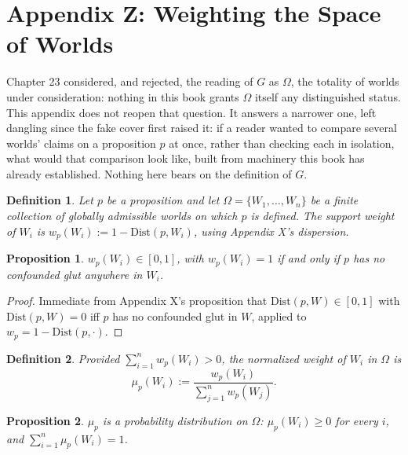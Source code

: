 \documentclass[11pt]{book}
\newtheorem*{appendixdefinition}{Definition}
\newtheorem*{appendixproposition}{Proposition}
\begin{document}
\chapter*{Appendix Z: Weighting the Space of Worlds}

Chapter 23 considered, and rejected, the reading of $G$ as $\Omega$, the totality of worlds under consideration: nothing in this book grants $\Omega$ itself any distinguished status. This appendix does not reopen that question. It answers a narrower one, left dangling since the fake cover first raised it: if a reader wanted to compare several worlds' claims on a proposition $p$ at once, rather than checking each in isolation, what would that comparison look like, built from machinery this book has already established. Nothing here bears on the definition of $G$.

\begin{appendixdefinition}
Let $p$ be a proposition and let $\Omega = \{W_1, \dots, W_n\}$ be a finite collection of globally admissible worlds on which $p$ is defined. The \emph{support weight} of $W_i$ is $w_p(W_i) := 1 - \mathrm{Dist}(p, W_i)$, using Appendix X's dispersion.
\end{appendixdefinition}

\begin{appendixproposition}
$w_p(W_i) \in [0,1]$, with $w_p(W_i) = 1$ if and only if $p$ has no confounded glut anywhere in $W_i$.
\end{appendixproposition}

\begin{proof}
Immediate from Appendix X's proposition that $\mathrm{Dist}(p,W) \in [0,1]$ with $\mathrm{Dist}(p,W) = 0$ iff $p$ has no confounded glut in $W$, applied to $w_p = 1 - \mathrm{Dist}(p,\cdot)$.
\end{proof}

\begin{appendixdefinition}
Provided $\sum_{i=1}^n w_p(W_i) > 0$, the \emph{normalized weight} of $W_i$ in $\Omega$ is
\[
\mu_p(W_i) := \frac{w_p(W_i)}{\sum_{j=1}^n w_p(W_j)}.
\]
\end{appendixdefinition}

\begin{appendixproposition}
$\mu_p$ is a probability distribution on $\Omega$: $\mu_p(W_i) \geq 0$ for every $i$, and $\sum_{i=1}^n \mu_p(W_i) = 1$.
\end{appendixproposition}
\end{document}
